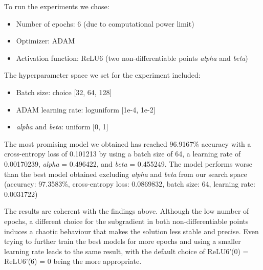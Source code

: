 To run the experiments we chose:

\begin{itemize}
\item Number of epochs: 6 (due to computational power limit)
\item Optimizer: ADAM 
\item Activation function: ReLU6 (two non-differentiable points \textit{alpha} and \textit{beta})
\end{itemize}

The hyperparameter space we set for the experiment included:

\begin{itemize}
\item Batch size: choice [32, 64, 128]
\item ADAM learning rate: loguniform [1e-4, 1e-2] 
\item \textit{alpha} and \textit{beta}: uniform [0, 1]
\end{itemize}

The most promising model we obtained has reached 96.9167\% accuracy with a cross-entropy loss of 0.101213 by using a batch size of 64, a learning rate of 0.00170239, \textit{alpha} = 0.496422, and \textit{beta} = 0.455249. The model performs worse than the best model obtained excluding \textit{alpha} and \textit{beta} from our search space (accuracy: 97.3583\%, cross-entropy loss: 0.0869832, batch size: 64, learning rate: 0.0031722)

The results are coherent with the findings above. Although the low number of epochs, a different choice for the subgradient in both non-differentiable points induces a chaotic behaviour that makes the solution less stable and precise. Even trying to further train the best models for more epochs and using a smaller learning rate leads to the same result, with the default choice of ReLU6'(0) = ReLU6'(6) = 0 being the more appropriate.

